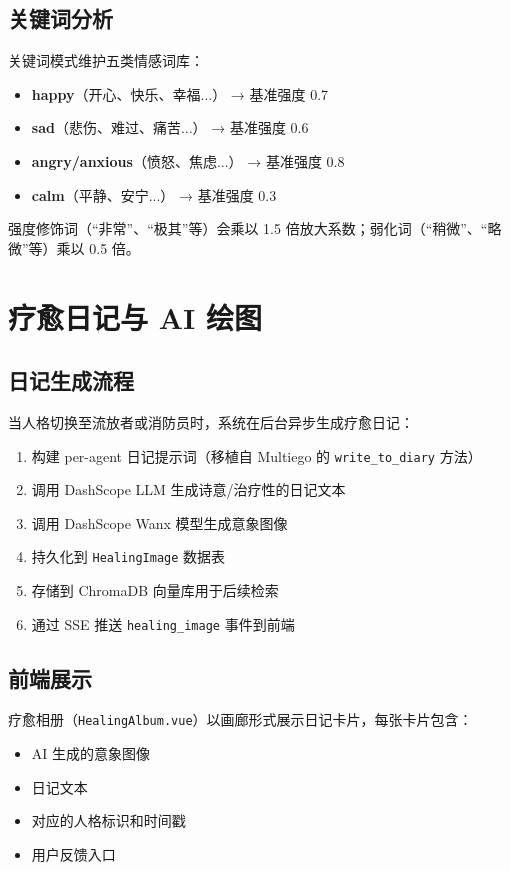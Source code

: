 \documentclass[12pt,a4paper]{ctexart}
\begin{document}
\subsection{关键词分析}

关键词模式维护五类情感词库：
\begin{itemize}[leftmargin=2em]
    \item \textbf{happy}（开心、快乐、幸福...） → 基准强度 0.7
    \item \textbf{sad}（悲伤、难过、痛苦...） → 基准强度 0.6
    \item \textbf{angry/anxious}（愤怒、焦虑...） → 基准强度 0.8
    \item \textbf{calm}（平静、安宁...） → 基准强度 0.3
\end{itemize}

强度修饰词（``非常''、``极其''等）会乘以 1.5 倍放大系数；弱化词（``稍微''、``略微''等）乘以 0.5 倍。

\section{疗愈日记与 AI 绘图}

\subsection{日记生成流程}

当人格切换至流放者或消防员时，系统在后台异步生成疗愈日记：

\begin{enumerate}[leftmargin=2em]
    \item 构建 per-agent 日记提示词（移植自 Multiego 的 \texttt{write\_to\_diary} 方法）
    \item 调用 DashScope LLM 生成诗意/治疗性的日记文本
    \item 调用 DashScope Wanx 模型生成意象图像
    \item 持久化到 \texttt{HealingImage} 数据表
    \item 存储到 ChromaDB 向量库用于后续检索
    \item 通过 SSE 推送 \texttt{healing\_image} 事件到前端
\end{enumerate}

\subsection{前端展示}

疗愈相册（\texttt{HealingAlbum.vue}）以画廊形式展示日记卡片，每张卡片包含：
\begin{itemize}[leftmargin=2em]
    \item AI 生成的意象图像
    \item 日记文本
    \item 对应的人格标识和时间戳
    \item 用户反馈入口
\end{itemize}
\end{document}
